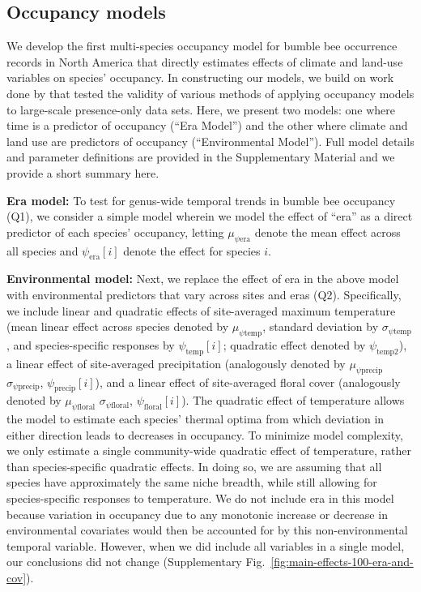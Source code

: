 \documentclass[12pt]{article}
\begin{document}
\subsection{Occupancy models}

We develop the first multi-species occupancy model for bumble bee occurrence records in North America that directly estimates effects of climate and land-use variables on species' occupancy. In constructing our models, we build on work done by \cite{Shirey-2022-x} that tested the validity of various methods of applying occupancy models to large-scale presence-only data sets. Here, we present two models: one where time is a predictor of occupancy (``Era Model'') and the other where climate and land use are predictors of occupancy (``Environmental Model''). Full model details and parameter definitions are provided in the Supplementary Material and we provide a short summary here.

\textbf{Era model:} To test for genus-wide temporal trends in bumble bee occupancy (Q1), we consider a simple model wherein we model the effect of ``era'' as a direct predictor of each species' occupancy, letting $\mu_{\psi\mathrm{era}}$ denote the mean effect across all species and $\psi_{\mathrm{era}}[i]$ denote the effect for species $i$.

\textbf{Environmental model:} Next, we replace the effect of era in the above model with environmental predictors that vary across sites and eras (Q2). Specifically, we include linear and quadratic effects of site-averaged maximum temperature (mean linear effect across species denoted by $\mu_{\psi{\mathrm{temp}}}$, standard deviation by $\sigma_{\psi\mathrm{temp}}$, and species-specific responses by $\psi_{\mathrm{temp}}[i]$; quadratic effect denoted by $\psi_{\mathrm{temp2}}$), a linear effect of site-averaged precipitation (analogously denoted by $\mu_{\psi{\mathrm{precip}}}$ $\sigma_{\psi\mathrm{precip}}$, $\psi_{\mathrm{precip}}[i]$), and a linear effect of site-averaged floral cover (analogously denoted by $\mu_{\psi{\mathrm{floral}}}$ $\sigma_{\psi\mathrm{floral}}$, $\psi_{\mathrm{floral}}[i]$). The quadratic effect of temperature allows the model to estimate each species' thermal optima from which deviation in either direction leads to decreases in occupancy. To minimize model complexity, we only estimate a single community-wide quadratic effect of temperature, rather than species-specific quadratic effects. In doing so, we are assuming that all species have approximately the same niche breadth, while still allowing for species-specific responses to temperature. We do not include era in this model because variation in occupancy due to any monotonic increase or decrease in environmental covariates would then be accounted for by this non-environmental temporal variable. However, when we did include all variables in a single model, our conclusions did not change (Supplementary  Fig.~\ref{fig:main-effects-100-era-and-cov}).
\end{document}
